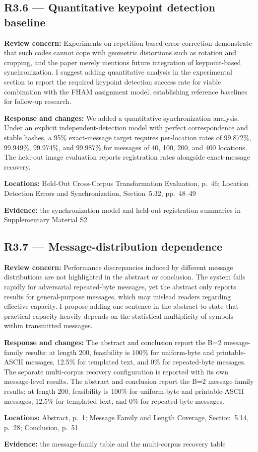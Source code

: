 \documentclass[12pt,a4paper]{article}
\newcommand{\revcomment}[1]{\par\medskip\noindent\textbf{Review concern:} #1\par\smallskip}
\newcommand{\responsechanges}[1]{\par\noindent\textbf{Response and changes:} #1\par}
\newcommand{\locations}[1]{\par\noindent\textbf{Locations:} #1\par}
\newcommand{\evidence}[1]{\par\noindent\textbf{Evidence:} #1\par\smallskip}
\begin{document}
\subsection*{R3.6 --- Quantitative keypoint detection baseline}

\revcomment{Experiments on repetition-based error correction demonstrate that such codes cannot cope with geometric distortions such as rotation and cropping, and the paper merely mentions future integration of keypoint-based synchronization. I suggest adding quantitative analysis in the experimental section to report the required keypoint detection success rate for viable combination with the FHAM assignment model, establishing reference baselines for follow-up research.}
\responsechanges{We added a quantitative synchronization analysis. Under an explicit independent-detection model with perfect correspondence and stable hashes, a 95\% exact-message target requires per-location rates of 99.872\%, 99.949\%, 99.974\%, and 99.987\% for messages of 40, 100, 200, and 400 locations. The held-out image evaluation reports registration rates alongside exact-message recovery.}
\locations{Held-Out Cross-Corpus Transformation Evaluation, p.~46; Location Detection Errors and Synchronization, Section~5.32, pp.~48--49}
\evidence{the synchronization model and held-out registration summaries in Supplementary Material S2}

\subsection*{R3.7 --- Message-distribution dependence}

\revcomment{Performance discrepancies induced by different message distributions are not highlighted in the abstract or conclusion. The system fails rapidly for adversarial repeated-byte messages, yet the abstract only reports results for general-purpose messages, which may mislead readers regarding effective capacity. I propose adding one sentence in the abstract to state that practical capacity heavily depends on the statistical multiplicity of symbols within transmitted messages.}
\responsechanges{The abstract and conclusion report the B=2 message-family results: at length 200, feasibility is 100\% for uniform-byte and printable-ASCII messages, 12.5\% for templated text, and 0\% for repeated-byte messages. The separate multi-corpus recovery configuration is reported with its own message-level results. The abstract and conclusion report the B=2 message-family results: at length 200, feasibility is 100\% for uniform-byte and printable-ASCII messages, 12.5\% for templated text, and 0\% for repeated-byte messages.}
\locations{Abstract, p.~1; Message Family and Length Coverage, Section~5.14, p.~28; Conclusion, p.~51}
\evidence{the message-family table and the multi-corpus recovery table}
\end{document}
